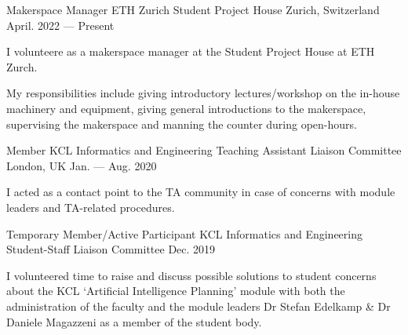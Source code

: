 

\begin{cventries}

  \cventry
  {Makerspace Manager} %
  {ETH Zurich Student Project House} %
  {Zurich, Switzerland} %
  {April. 2022 --- Present} %
  {
    \begin{cvitems} %
      \item I volunteere as a makerspace manager at the Student Project House at ETH Zurch.
      \item My responsibilities include giving introductory lectures/workshop on the in-house machinery and equipment, giving general introductions to the makerspace, supervising the makerspace and manning the counter during open-hours.
    \end{cvitems}
  }
  
  \cventry
  {Member} %
  {KCL Informatics and Engineering Teaching Assistant Liaison Committee} %
  {London, UK} %
  {Jan. --- Aug. 2020} %
  {
    \begin{cvitems} %
      \item I acted as a contact point to the TA community in case of concerns with module leaders and TA-related procedures.
    \end{cvitems}
  }

  \cventry
  {Temporary Member/Active Participant} %
  {KCL Informatics and Engineering Student-Staff Liaison Committee} %
  {} %
  {Dec. 2019} %
  {
    \begin{cvitems} %
      \item {I volunteered time to raise and discuss possible solutions to student concerns about the KCL `Artificial Intelligence Planning' module with both the administration of the faculty and the module leaders Dr Stefan Edelkamp \& Dr Daniele Magazzeni as a member of the student body.}
    \end{cvitems}
  }


\end{cventries}
